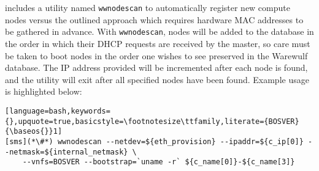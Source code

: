 \begin{center}
\begin{tcolorbox}[]
\small \Warewulf{} includes a utility named \texttt{wwnodescan} 
to automatically register new compute nodes versus the outlined approach
which requires hardware MAC addresses to be gathered in advance.  With
\texttt{wwnodescan}, nodes will be added to the \Warewulf{} database in the
order in which their DHCP requests are received by the master, so care must be
taken to boot nodes in the order one wishes to see preserved in the Warewulf
database. The IP address provided will be incremented after each node is found,
and the utility will exit after all specified nodes have been found. Example
usage is highlighted below:
\begin{lstlisting}[language=bash,keywords={},upquote=true,basicstyle=\footnotesize\ttfamily,literate={BOSVER}{\baseos{}}1]
[sms](*\#*) wwnodescan --netdev=${eth_provision} --ipaddr=${c_ip[0]} --netmask=${internal_netmask} \
    --vnfs=BOSVER --bootstrap=`uname -r` ${c_name[0]}-${c_name[3]}
\end{lstlisting}
\end{tcolorbox}
\end{center}
